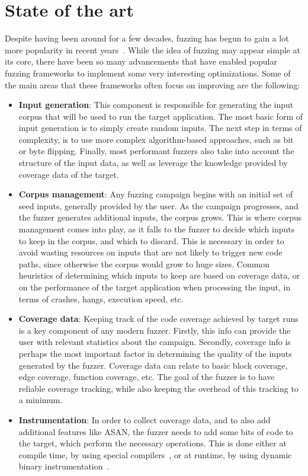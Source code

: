 
\chapter{State of the art}\label{chapter:state_of_the_art}
Despite having been around for a few decades, fuzzing has begun to gain a lot more popularity in recent years~\parencite{8371326}.
While the idea of fuzzing may appear simple at its core, there have been so many advancements that have enabled popular fuzzing
frameworks to implement some very interesting optimizations. Some of the main areas that these frameworks often focus
on improving are the following:

\begin{itemize}
    \item \textbf{Input generation}: This component is responsible for generating the input corpus that will be used to
    run the target application. The most basic form of input generation is to simply create random inputs. The next step
    in terms of complexity, is to use more complex algorithm-based approaches, such as bit or byte flipping. Finally,
    most performant fuzzers also take into account the structure of the input data, as well as leverage the knowledge
    provided by coverage data of the target.
    \item \textbf{Corpus management}: Any fuzzing campaign begins with an initial set of seed inputs, generally provided by the
    user. As the campaign progresses, and the fuzzer generates additional inputs, the corpus grows. This is where corpus
    management comes into play, as it falls to the fuzzer to decide which inputs to keep in the corpus, and which to discard.
    This is necessary in order to avoid wasting resources on inputs that are not likely to trigger new code paths, since otherwise
    the corpus would grow to huge sizes. Common heuristics of determining which inputs to keep are based on coverage data, or
    on the performance of the target application when processing the input, in terms of crashes, hangs, execution speed, etc.
    \item \textbf{Coverage data}: Keeping track of the code coverage achieved by target runs is a key component of any 
    modern fuzzer. Firstly, this info can provide the user with relevant statistics about the campaign. Secondly, coverage info
    is perhaps the most important factor in determining the quality of the inputs generated by the fuzzer. Coverage data can
    relate to basic block coverage, edge coverage, function coverage, etc. The goal of the fuzzer is to have reliable coverage
    tracking, while also keeping the overhead of this tracking to a minimum.
    \item \textbf{Instrumentation}: In order to collect coverage data, and to also add additional features like \ac{ASAN},
    the fuzzer needs to add some bits of code to the target, which perform the necessary operations. This is done either
    at compile time, by using special compilers~\parencite{8989335}, or at runtime, by using dynamic binary 
    instrumentation~\parencite{269899}.
\end{itemize}


